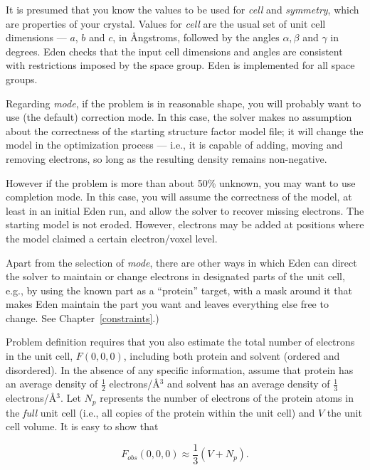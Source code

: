 \documentclass{report}
\begin{document}
It is presumed that you know the values to be used for 
{\it cell} and {\it symmetry}, which are properties of your crystal.
Values for {\it cell} are the usual set of unit cell dimensions --- $a$, $b$ and
$c$, in \AA ngstroms, followed by the angles $\alpha, \beta$ 
and $\gamma$ in degrees.  
Eden checks that the input cell dimensions and angles are consistent with
restrictions imposed by the space group.
Eden is implemented for all space groups.

\vspace {0.1in}

Regarding {\it mode}, if the problem is in reasonable shape, you will probably want
to use (the default) correction mode.
In this case, the solver makes no assumption about the correctness 
of the starting structure factor model file;
it will change the model in the optimization process --- 
i.e., it is capable of adding, moving and removing electrons, 
so long as the resulting density remains non-negative.  

However if the problem is more than about 50\% unknown, you may want to use
completion mode.  In this case, you will assume the correctness of the model, at
least in an initial Eden run, and allow the solver to recover missing electrons.
The starting model is not eroded.  However, electrons
may be added at positions where the model claimed a certain 
electron/voxel level.

Apart from the selection of {\it mode}, there are other
ways in which Eden can direct the solver to maintain or change electrons 
in designated parts of the unit cell, e.g., by using the known part as a ``protein''
target, with a mask around it that makes Eden maintain the part you want
and leaves everything else free to change.
See Chapter~\ref{constraints}.)

\vspace {0.1in}

Problem definition requires that you also
estimate the total number of electrons in the unit cell, $F(0,0,0)$,
including both protein and solvent (ordered and disordered).  
In the absence of any specific information, assume that protein
has an average density of $\frac{1}{2}$ electrons/\AA$^3$ and solvent
has an average density of $\frac{1}{3}$ electrons/\AA$^3$.
Let $N_p$ represents the number of electrons of the
protein atoms in the {\em full} unit cell 
(i.e., all copies of the protein within the unit cell)
and $V$ the unit cell volume.
It is easy to show that

$$ F_{obs}(0,0,0) \approx \frac{1}{3}(V + N_p). $$
\end{document}
